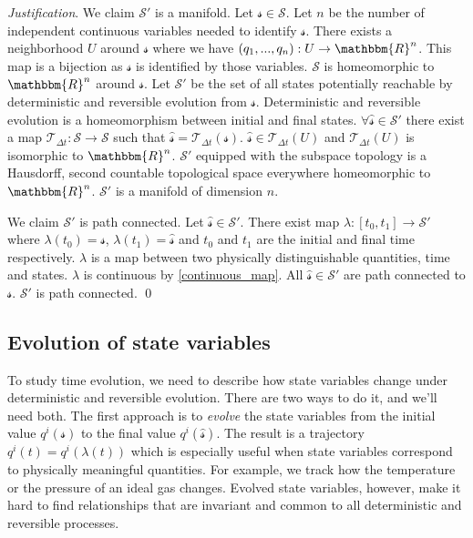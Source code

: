 \documentclass[aps,pra,10pt,twocolumn,floatfix,nofootinbib]{revtex4-1}
\numberwithin{equation}{section}
\theoremstyle{definition}
\newenvironment{justification}{\emph{Justification}.}{\qed}
\begin{document}
\begin{justification}
	We claim $\mathcal{S}'$ is a manifold. Let $\mathcal{s} \in \mathcal{S}$. Let $n$ be the number of independent continuous variables needed to identify $\mathcal{s}$. There exists a neighborhood $U$ around $\mathcal{s}$ where we have $(q_1,...,q_n):U\rightarrow \mathbbm{R}^n$. This map is a bijection as $\mathcal{s}$ is identified by those variables. $\mathcal{S}$ is homeomorphic to $\mathbbm{R}^n$ around  $\mathcal{s}$. Let $\mathcal{S}'$ be the set of all states potentially reachable by deterministic and reversible evolution from $\mathcal{s}$. Deterministic and reversible evolution is a homeomorphism between initial and final states. $\forall \hat{\mathcal{s}} \in \mathcal{S}'$ there exist a map $\mathcal{T}_{\Delta t}:\mathcal{S} \rightarrow \mathcal{S}$ such that $\hat{\mathcal{s}} =\mathcal{T}_{\Delta t}(\mathcal{s})$. $\hat{\mathcal{s}} \in \mathcal{T}_{\Delta t}(U)$ and $\mathcal{T}_{\Delta t}(U)$ is isomorphic to $\mathbbm{R}^n$. $\mathcal{S}'$ equipped with the subspace topology is a Hausdorff, second countable topological space everywhere homeomorphic to $\mathbbm{R}^n$. $\mathcal{S}'$ is a manifold of dimension $n$.
	
	We claim $\mathcal{S}'$ is path connected. Let $\hat{\mathcal{s}} \in \mathcal{S}'$. There exist map $\lambda : [t_0,t_1] \rightarrow \mathcal{S}'$ where $\lambda(t_0)=\mathcal{s}$, $\lambda(t_1)=\hat{\mathcal{s}}$ and $t_0$ and $t_1$ are the initial and final time respectively. $\lambda$ is a map between two physically distinguishable quantities, time and states. $\lambda$ is continuous by \ref{continuous_map}. All $\hat{\mathcal{s}} \in \mathcal{S}'$ are path connected to $\mathcal{s}$. $\mathcal{S}'$ is path connected.
\end{justification}

\subsection{Evolution of state variables}

To study time evolution, we need to describe how state variables change under deterministic and reversible evolution. There are two ways to do it, and we'll need both. The first approach is to \emph{evolve} the state variables from the initial value $q^i(\mathcal{s})$ to the final value $q^i(\hat{\mathcal{s}})$. The result is a trajectory $q^i(t)=q^i(\lambda(t))$ which is especially useful when state variables correspond to physically meaningful quantities. For example, we track how the temperature or the pressure of an ideal gas changes. Evolved state variables, however, make it hard to find relationships that are invariant and common to all deterministic and reversible processes.
\end{document}
